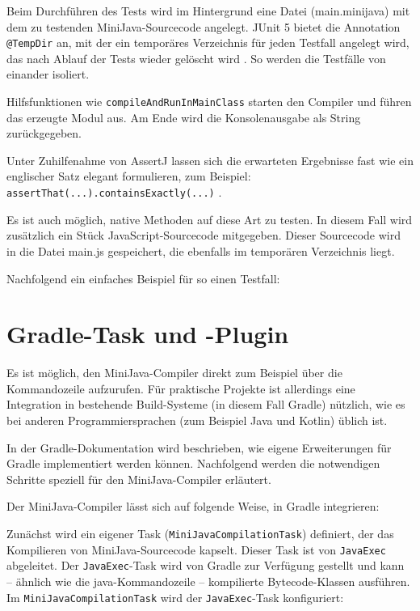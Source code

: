 Beim Durchführen des Tests wird im Hintergrund eine Datei (main.minijava) mit dem zu testenden MiniJava-Sourcecode angelegt. JUnit 5 bietet die Annotation \lstinline{@TempDir} an, mit der ein temporäres Verzeichnis für jeden Testfall angelegt wird, das nach Ablauf der Tests wieder gelöscht wird \cite{JUnit}. So werden die Testfälle von einander isoliert.

Hilfsfunktionen wie \lstinline{compileAndRunInMainClass} starten den Compiler und führen das erzeugte Modul aus. Am Ende wird die Konsolenausgabe als String zurückgegeben.

Unter Zuhilfenahme von AssertJ lassen sich die erwarteten Ergebnisse fast wie ein englischer Satz elegant formulieren, zum Beispiel: \lstinline{assertThat(...).containsExactly(...)} \cite{AssertJ}.

Es ist auch möglich, native Methoden auf diese Art zu testen. In diesem Fall wird zusätzlich ein Stück JavaScript-Sourcecode mitgegeben. Dieser Sourcecode wird in die Datei main.js gespeichert, die ebenfalls im temporären Verzeichnis liegt.

Nachfolgend ein einfaches Beispiel für so einen Testfall:



\section{Gradle-Task und -Plugin}

Es ist möglich, den MiniJava-Compiler direkt zum Beispiel über die Kommandozeile aufzurufen. Für praktische Projekte ist allerdings eine Integration in bestehende Build-Systeme (in diesem Fall Gradle) nützlich, wie es bei anderen Programmiersprachen (zum Beispiel Java und Kotlin) üblich ist.

In der Gradle-Dokumentation \cite{Gradle} wird beschrieben, wie eigene Erweiterungen für Gradle implementiert werden können. Nachfolgend werden die notwendigen Schritte speziell für den MiniJava-Compiler erläutert.

Der MiniJava-Compiler lässt sich auf folgende Weise, in Gradle integrieren:

Zunächst wird ein eigener Task (\lstinline{MiniJavaCompilationTask}) definiert, der das Kompilieren von MiniJava-Sourcecode kapselt. Dieser Task ist von \lstinline{JavaExec} abgeleitet. Der \lstinline{JavaExec}-Task wird von Gradle zur Verfügung gestellt und kann -- ähnlich wie die java-Kommandozeile -- kompilierte Bytecode-Klassen ausführen. Im \lstinline{MiniJavaCompilationTask} wird der \lstinline{JavaExec}-Task konfiguriert:


